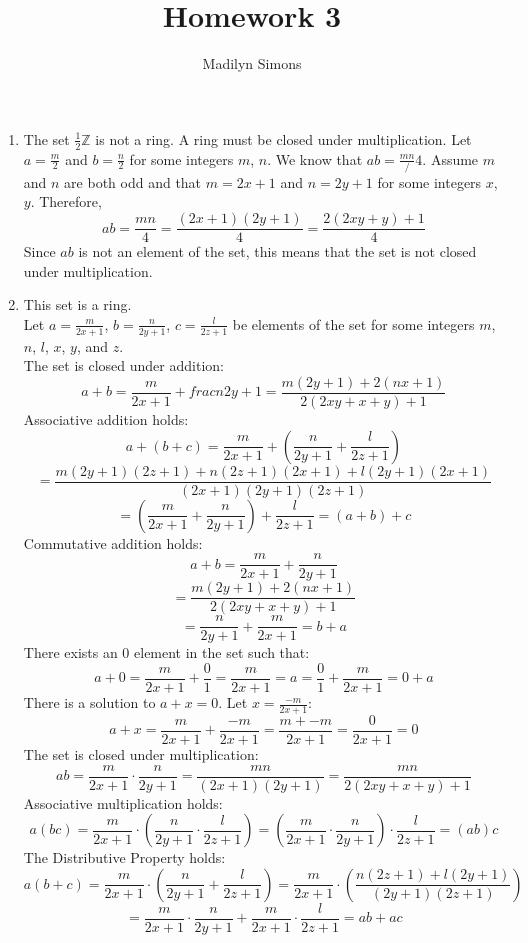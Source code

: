 \documentclass{article}
\title{Homework 3}
\author{Madilyn Simons}
\date{}
\begin{document}
\maketitle

\begin{enumerate}

\item The set $\frac{1}{2}\mathbb{Z}$ is not a ring.  A ring must be closed under
multiplication.  Let $a = \frac{m}{2}$ and $b = \frac{n}{2}$ for some integers
$m$, $n$.  We know that $ab = \frac{mn}/4$.  Assume $m$ and $n$ are both odd and
that $m = 2x + 1$ and $n = 2y + 1$ for some integers $x$, $y$.  Therefore,
\[
ab = \frac{mn}{4} = \frac{(2x+1)(2y+1)}{4} = \frac{2(2xy+y)+1}{4}
\]
Since $ab$ is not an element of the set, this means that the set is not closed
under multiplication.

\item This set is a ring. \\
Let $a = \frac{m}{2x+1}$, $b=\frac{n}{2y+1}$, $c=\frac{l}{2z+1}$ be elements of
the set for some integers $m$, $n$, $l$, $x$, $y$, and $z$.\\
The set is closed under addition:
\[
a + b = \frac{m}{2x+1} + frac{n}{2y+1} = \frac{m(2y+1) + 2(nx+1)}{2(2xy+x+y)+1}
\]
Associative addition holds:
\[
a+(b+c) = \frac{m}{2x+1} + (\frac{n}{2y+1} + \frac{l}{2z+1})
\]
\[
= \frac{m(2y+1)(2z+1) + n(2z+1)(2x+1) + l(2y+1)(2x+1)}{(2x+1)(2y+1)(2z+1)}
\]
\[
= (\frac{m}{2x+1} + \frac{n}{2y+1}) + \frac{l}{2z+1} = (a+b)+c
\]
Commutative addition holds:
\[
a + b = \frac{m}{2x+1} + \frac{n}{2y+1}
\]
\[
= \frac{m(2y+1) + 2(nx+1)}{2(2xy+x+y)+1}
\]
\[
= \frac{n}{2y+1} + \frac{m}{2x+1} = b + a
\]
There exists an $0$ element in the set such that:
\[
a + 0 = \frac{m}{2x+1} + \frac{0}{1} = \frac{m}{2x+1} = a
= \frac{0}{1} + \frac{m}{2x+1} = 0 + a
\]
There is a solution to $a + x = 0$.  Let $x = \frac{-m}{2x+1}$:
\[
a + x = \frac{m}{2x+1} + \frac{-m}{2x+1} = \frac{m + {-m}}{2x+1} = \frac{0}{2x+1} = 0
\]
The set is closed under multiplication:
\[
ab = \frac{m}{2x+1}\cdot\frac{n}{2y+1} = \frac{mn}{(2x+1)(2y+1)} = \frac{mn}{2(2xy+x+y)+1}
\]
Associative multiplication holds:
\[
a(bc) = \frac{m}{2x+1}\cdot(\frac{n}{2y+1}\cdot\frac{l}{2z+1}) = (\frac{m}{2x+1}\cdot\frac{n}{2y+1})\cdot\frac{l}{2z+1}
= (ab)c
\]
The Distributive Property holds:
\[
a(b+c) = \frac{m}{2x+1}\cdot(\frac{n}{2y+1}+\frac{l}{2z+1})
= \frac{m}{2x+1}\cdot(\frac{n(2z+1) + l(2y+1)}{(2y+1)(2z+1)})
\]
\[
= \frac{m}{2x+1}\cdot\frac{n}{2y+1} + \frac{m}{2x+1}\cdot\frac{l}{2z+1}
=ab+ac
\]


\end{enumerate}
\end{document}
